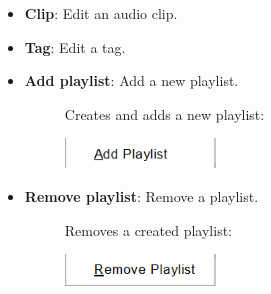 \documentclass{article}
\begin{document}
\begin{itemize}
    \item \textbf{Clip}: Edit an audio clip.
    \item \textbf{Tag}: Edit a tag.
    \item \textbf{Add playlist}: Add a new playlist.
    \begin{description}
        \item[] Creates and adds a new playlist:
        \item[] \includegraphics[width=4cm]{Images/Edit AddPlaylist.png}
    \end{description}
    \item \textbf{Remove playlist}: Remove a playlist.
        \begin{description}
        \item[] Removes a created playlist:
        \item[] \includegraphics[width=4cm]{Images/Edit RemovePlaylist.png}
    \end{description}
\end{itemize}
\end{document}
